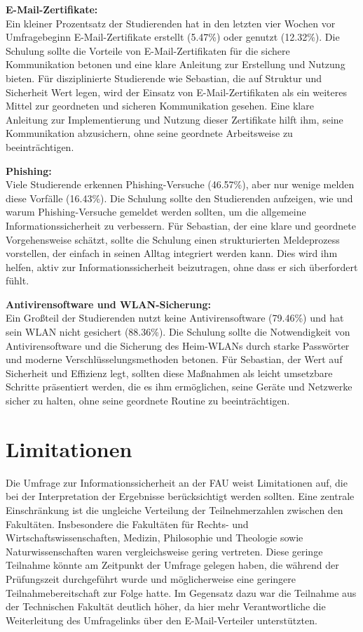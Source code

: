 \documentclass[german,report]{i1thesis}
\begin{document}
\textbf{E-Mail-Zertifikate:}\\
Ein kleiner Prozentsatz der Studierenden hat in den letzten vier Wochen vor Umfragebeginn E-Mail-Zertifikate erstellt (5.47\%) oder genutzt (12.32\%). Die Schulung sollte die Vorteile von E-Mail-Zertifikaten für die sichere Kommunikation betonen und eine klare Anleitung zur Erstellung und Nutzung bieten. Für disziplinierte Studierende wie Sebastian, die auf Struktur und Sicherheit Wert legen, wird der Einsatz von E-Mail-Zertifikaten als ein weiteres Mittel zur geordneten und sicheren Kommunikation gesehen. Eine klare Anleitung zur Implementierung und Nutzung dieser Zertifikate hilft ihm, seine Kommunikation abzusichern, ohne seine geordnete Arbeitsweise zu beeinträchtigen.

\textbf{Phishing:}\\
Viele Studierende erkennen Phishing-Versuche (46.57\%), aber nur wenige melden diese Vorfälle (16.43\%). Die Schulung sollte den Studierenden aufzeigen, wie und warum Phishing-Versuche gemeldet werden sollten, um die allgemeine Informationssicherheit zu verbessern. Für Sebastian, der eine klare und geordnete Vorgehensweise schätzt, sollte die Schulung einen strukturierten Meldeprozess vorstellen, der einfach in seinen Alltag integriert werden kann. Dies wird ihm helfen, aktiv zur Informationssicherheit beizutragen, ohne dass er sich überfordert fühlt.

\textbf{Antivirensoftware und WLAN-Sicherung:}\\
Ein Großteil der Studierenden nutzt keine Antivirensoftware (79.46\%) und hat sein WLAN nicht gesichert (88.36\%). Die Schulung sollte die Notwendigkeit von Antivirensoftware und die Sicherung des Heim-WLANs durch starke Passwörter und moderne Verschlüsselungsmethoden betonen. Für Sebastian, der Wert auf Sicherheit und Effizienz legt, sollten diese Maßnahmen als leicht umsetzbare Schritte präsentiert werden, die es ihm ermöglichen, seine Geräte und Netzwerke sicher zu halten, ohne seine geordnete Routine zu beeinträchtigen.

\section{Limitationen}
\label{sec:limitations}
Die Umfrage zur Informationssicherheit an der FAU weist Limitationen auf, die bei der Interpretation der Ergebnisse berücksichtigt werden sollten. Eine zentrale Einschränkung ist die ungleiche Verteilung der Teilnehmerzahlen zwischen den Fakultäten. Insbesondere die Fakultäten für Rechts- und Wirtschaftswissenschaften, Medizin, Philosophie und Theologie sowie Naturwissenschaften waren vergleichsweise gering vertreten. Diese geringe Teilnahme könnte am Zeitpunkt der Umfrage gelegen haben, die während der Prüfungszeit durchgeführt wurde und möglicherweise eine geringere Teilnahmebereitschaft zur Folge hatte. Im Gegensatz dazu war die Teilnahme aus der Technischen Fakultät deutlich höher, da hier mehr Verantwortliche die Weiterleitung des Umfragelinks über den E-Mail-Verteiler unterstützten.
\end{document}
